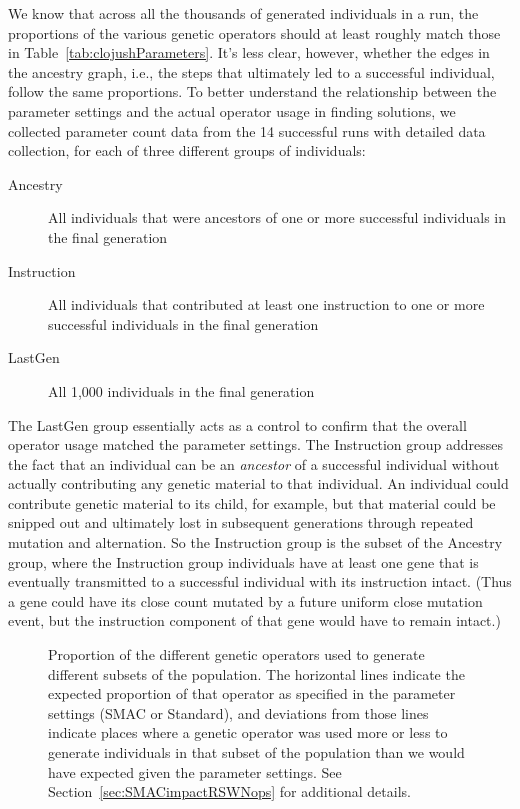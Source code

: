 We know that across all the thousands of generated individuals in a run,
the proportions of the various genetic operators should at least roughly
match those in Table~\ref{tab:clojushParameters}. It's less clear, however,
whether the edges in the ancestry graph, i.e., the steps that ultimately led
to a successful individual, follow the same proportions. To better understand
the relationship between the parameter settings and the actual operator usage
in finding solutions, we collected parameter count data from the 14 successful
runs with detailed data collection, for each of three different 
groups of individuals:
\begin{description}
	\item[Ancestry] All individuals that were ancestors of one or more successful
	individuals in the final generation
	\item[Instruction] All individuals that contributed at least one instruction to
	one or more successful individuals in the final generation
	\item[LastGen] All 1,000 individuals in the final generation
\end{description}
The LastGen group essentially acts as a control to confirm that 
the overall operator usage matched the parameter settings. The Instruction group
addresses the fact that an individual can be an \emph{ancestor} of a
successful individual without actually contributing any genetic material
to that individual. An individual could contribute genetic material to its
child, for example, but that material could be snipped out and 
ultimately lost in subsequent
generations through repeated mutation and alternation. So the Instruction
group is the subset of the Ancestry group, where the Instruction group 
individuals have
at least one gene that is eventually transmitted to a successful individual
with its instruction intact. (Thus a gene could have its close count mutated
by a future uniform close mutation event, but the instruction component of
that gene would have to remain intact.)

\begin{figure*}
	\caption{Proportion of the different genetic operators used to
	generate different subsets of the population. The horizontal lines 
	indicate the expected proportion of that operator as specified in 
	the parameter settings (SMAC or Standard), and deviations from those
	lines indicate places where a genetic operator was used more or less
	to generate individuals in that subset of the population 
	than we would have expected given the parameter settings. See 
	Section~\ref{sec:SMACimpactRSWNops} for additional details.}
	\label{fig:opProportions}
\end{figure*}

